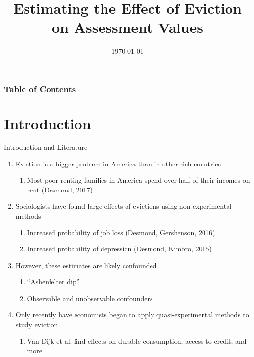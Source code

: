 \documentclass [xcolor=svgnames, t] {beamer}
\title[Eviction and Property Values]{Estimating the Effect of Eviction on Assessment Values}
\author[Arjun Shanmugam]{}
\date{\today}
\begin{document}
\begin{frame}
\maketitle
\end{frame}


\begin{frame}
\frametitle{Table of Contents}
\tableofcontents
\end{frame}

\section{Introduction}
\begin{frame}{Introduction and Literature}
   \begin{enumerate}
       \item Eviction is a bigger problem in America than in other rich countries
       \begin{enumerate}
           \item Most poor renting families in America
spend over half of their incomes on rent (Desmond, 2017)
       \end{enumerate}
       \item Sociologists have found large effects of evictions using non-experimental methods
       \begin{enumerate}
           \item Increased probability of job loss (Desmond, Gershenson, 2016)
           \item Increased probability of depression (Desmond, Kimbro, 2015)
       \end{enumerate} 
       \item However, these estimates are likely confounded
       \begin{enumerate}
           \item ``Ashenfelter dip''
           \item Observable and unobservable confounders
       \end{enumerate}
       \item Only recently have economists began to apply quasi-experimental methods to study eviction
        \begin{enumerate}
            \item Van Dijk et al. find effects on durable consumption, access to credit, and more
        \end{enumerate}
   \end{enumerate}
\end{frame}
\end{document}
